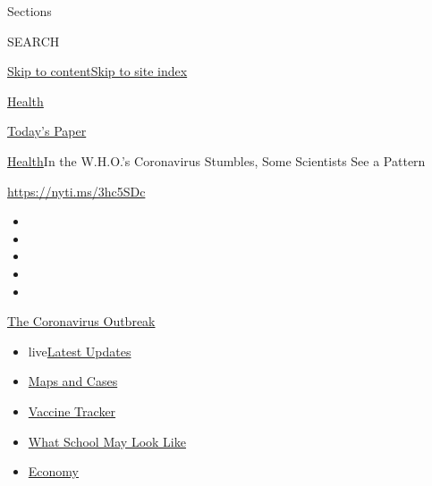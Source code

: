 Sections

SEARCH

\protect\hyperlink{site-content}{Skip to
content}\protect\hyperlink{site-index}{Skip to site index}

\href{https://www.nytimes.com/section/health}{Health}

\href{https://myaccount.nytimes.com/auth/login?response_type=cookie\&client_id=vi}{}

\href{https://www.nytimes.com/section/todayspaper}{Today's Paper}

\href{/section/health}{Health}\textbar{}In the W.H.O.'s Coronavirus
Stumbles, Some Scientists See a Pattern

\url{https://nyti.ms/3hc5SDc}

\begin{itemize}
\item
\item
\item
\item
\item
\end{itemize}

\href{https://www.nytimes.com/news-event/coronavirus?action=click\&pgtype=Article\&state=default\&region=TOP_BANNER\&context=storylines_menu}{The
Coronavirus Outbreak}

\begin{itemize}
\tightlist
\item
  live\href{https://www.nytimes.com/2020/08/01/world/coronavirus-covid-19.html?action=click\&pgtype=Article\&state=default\&region=TOP_BANNER\&context=storylines_menu}{Latest
  Updates}
\item
  \href{https://www.nytimes.com/interactive/2020/us/coronavirus-us-cases.html?action=click\&pgtype=Article\&state=default\&region=TOP_BANNER\&context=storylines_menu}{Maps
  and Cases}
\item
  \href{https://www.nytimes.com/interactive/2020/science/coronavirus-vaccine-tracker.html?action=click\&pgtype=Article\&state=default\&region=TOP_BANNER\&context=storylines_menu}{Vaccine
  Tracker}
\item
  \href{https://www.nytimes.com/interactive/2020/07/29/us/schools-reopening-coronavirus.html?action=click\&pgtype=Article\&state=default\&region=TOP_BANNER\&context=storylines_menu}{What
  School May Look Like}
\item
  \href{https://www.nytimes.com/live/2020/07/31/business/stock-market-today-coronavirus?action=click\&pgtype=Article\&state=default\&region=TOP_BANNER\&context=storylines_menu}{Economy}
\end{itemize}


